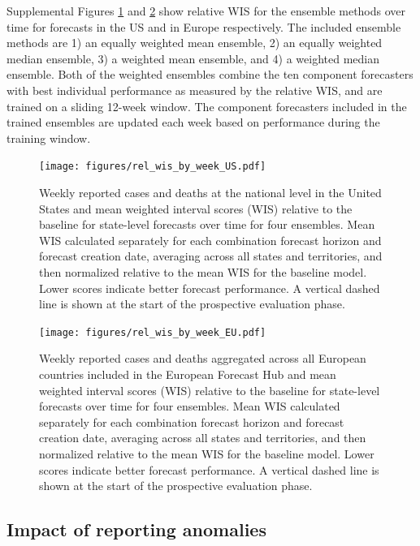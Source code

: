 \documentclass{article}
\begin{document}
Supplemental Figures \ref{fig:rel_WIS_over_time_us} and \ref{fig:rel_WIS_over_time_euro} show relative WIS for the ensemble methods over time for forecasts in the US and in Europe respectively.
The included ensemble methods are 1) an equally weighted mean ensemble, 2) an equally weighted median ensemble, 3) a weighted mean ensemble, and 4) a weighted median ensemble.
Both of the weighted ensembles combine the ten component forecasters with best individual performance as measured by the relative WIS, and are trained on a sliding 12-week window.
The component forecasters included in the trained ensembles are updated each week based on performance during the training window.
  
\begin{figure}[H]
  \texttt{[image: figures/rel\_wis\_by\_week\_US.pdf]}
  \caption{Weekly reported cases and deaths at the national level in the United States and mean weighted interval scores (WIS) relative to the baseline for state-level forecasts over time for four ensembles.
  Mean WIS calculated separately for each combination forecast horizon and forecast creation date, averaging across all states and territories, and then normalized relative to the mean WIS for the baseline model.
  Lower scores indicate better forecast performance.
  A vertical dashed line is shown at the start of the prospective evaluation phase.
  }
  \label{fig:rel_WIS_over_time_us}
\end{figure}

\begin{figure}[H]
  \texttt{[image: figures/rel\_wis\_by\_week\_EU.pdf]}
  \caption{Weekly reported cases and deaths aggregated across all European countries included in the European Forecast Hub and mean weighted interval scores (WIS) relative to the baseline for state-level forecasts over time for four ensembles.
  Mean WIS calculated separately for each combination forecast horizon and forecast creation date, averaging across all states and territories, and then normalized relative to the mean WIS for the baseline model.
  Lower scores indicate better forecast performance.
  A vertical dashed line is shown at the start of the prospective evaluation phase.
}
  \label{fig:rel_WIS_over_time_euro}
\end{figure}

\newpage

\subsection{Impact of reporting anomalies}
\end{document}
